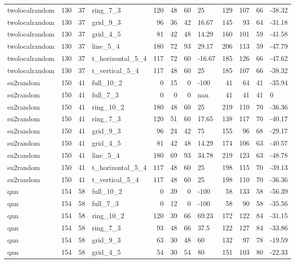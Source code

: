 \begin{longtable}{lrrlrrrlrrrl}
twolocalrandom & 130 & 37 & ring\_7\_3 & 120 & 48 & 60 & 25 & 129 & 107 & 66 & -38.32 \\
twolocalrandom & 130 & 37 & grid\_9\_3 & 96 & 36 & 42 & 16.67 & 145 & 93 & 64 & -31.18 \\
twolocalrandom & 130 & 37 & grid\_4\_5 & 81 & 42 & 48 & 14.29 & 160 & 101 & 59 & -41.58 \\
twolocalrandom & 130 & 37 & line\_5\_4 & 180 & 72 & 93 & 29.17 & 206 & 113 & 59 & -47.79 \\
twolocalrandom & 130 & 37 & t\_horizontal\_5\_4 & 117 & 72 & 60 & -16.67 & 185 & 126 & 66 & -47.62 \\
twolocalrandom & 130 & 37 & t\_vertical\_5\_4 & 117 & 48 & 60 & 25 & 185 & 107 & 66 & -38.32 \\
su2random & 150 & 41 & full\_10\_2 & 0 & 15 & 0 & -100 & 41 & 64 & 41 & -35.94 \\
su2random & 150 & 41 & full\_7\_3 & 0 & 0 & 0 & nan & 41 & 41 & 41 & 0 \\
su2random & 150 & 41 & ring\_10\_2 & 180 & 48 & 60 & 25 & 219 & 110 & 70 & -36.36 \\
su2random & 150 & 41 & ring\_7\_3 & 120 & 51 & 60 & 17.65 & 138 & 117 & 70 & -40.17 \\
su2random & 150 & 41 & grid\_9\_3 & 96 & 24 & 42 & 75 & 155 & 96 & 68 & -29.17 \\
su2random & 150 & 41 & grid\_4\_5 & 81 & 42 & 48 & 14.29 & 174 & 106 & 63 & -40.57 \\
su2random & 150 & 41 & line\_5\_4 & 180 & 69 & 93 & 34.78 & 219 & 123 & 63 & -48.78 \\
su2random & 150 & 41 & t\_horizontal\_5\_4 & 117 & 48 & 60 & 25 & 198 & 115 & 70 & -39.13 \\
su2random & 150 & 41 & t\_vertical\_5\_4 & 117 & 48 & 60 & 25 & 198 & 110 & 70 & -36.36 \\
qnn & 154 & 58 & full\_10\_2 & 0 & 39 & 0 & -100 & 58 & 133 & 58 & -56.39 \\
qnn & 154 & 58 & full\_7\_3 & 0 & 12 & 0 & -100 & 58 & 90 & 58 & -35.56 \\
qnn & 154 & 58 & ring\_10\_2 & 120 & 39 & 66 & 69.23 & 172 & 122 & 84 & -31.15 \\
qnn & 154 & 58 & ring\_7\_3 & 93 & 48 & 66 & 37.5 & 122 & 127 & 84 & -33.86 \\
qnn & 154 & 58 & grid\_9\_3 & 63 & 30 & 48 & 60 & 132 & 97 & 78 & -19.59 \\
qnn & 154 & 58 & grid\_4\_5 & 54 & 30 & 54 & 80 & 151 & 103 & 80 & -22.33 \\

\end{longtable}

